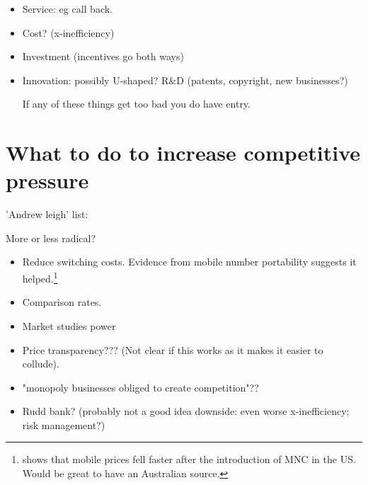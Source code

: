 \begin{itemize}
\begin{itemize}
    \end{itemize}
    \item Service: eg call back. 
    \item Cost? (x-inefficiency)
    \item Investment (incentives go both ways)
    \item Innovation: possibly U-shaped? R\&D (patents, copyright, new businesses?)

If any of these things get too bad you do have entry. 

\end{itemize} 



\section{What to do to increase competitive pressure}

'Andrew leigh' list:

More or less radical? 

\begin{itemize}
    \item Reduce switching costs. Evidence from mobile number portability suggests it helped.\footnote{\textcite{singer2014consumer} shows that mobile prices fell faster after the introduction of MNC in the US. Would be great to have an Australian source.}
    \item Comparison rates.
    \item Market studies power
    \item Price transparency??? (Not clear if this works as it makes it easier to collude).
    \item "monopoly businesses obliged to create competition"?? 
    \item Rudd bank? (probably not a good idea downside: even worse x-inefficiency; risk management?)
    
\end{itemize} 
